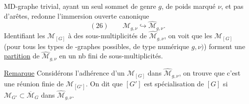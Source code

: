 MD-graphe trivial, ayant un seul sommet de genre $g$, de poids marqué $\nu$, et pas d'arêtes, redonne l'immersion ouverte canonique
\[
(26)\qquad\mathcal M_{g,\nu}\hookrightarrow\widehat{\mathcal M}_{g,\nu}.
\]
Identifiant les $\mathcal M_{[G]}$ à des sous-multiplicités de $\widehat{\mathcal M}_{g,\nu}$, on voit que les $\mathcal M_{[G]}$ (pour tous les types de -graphes possibles, de type numérique $g,\nu)$) forment une \uline{partition} de $\widehat{\mathcal M}_{g,\nu}$ en un nb fini de sous-multiplicités.

\uline{Remarque} Considérons l'adhérence d'un $\mathcal M_{[G]}$ dans $\widehat{\mathcal M}_{g,\nu}$, on trouve que c'est une réunion finie de $\mathcal M_{[G']}$. On dit que $[G']$ est spécialisation de $[G]$ si $\mathcal M_{G'}\subset\overline{\mathcal M}_G$ dans $\widehat{\mathcal M}_{g,\nu}$.
